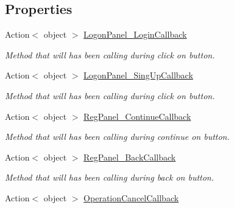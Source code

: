 \subsection*{Properties}
\begin{DoxyCompactItemize}
\item 
Action$<$ object $>$ \mbox{\hyperlink{class_wpf_handler_1_1_u_i_1_1_controls_1_1_logon_1_1_logon_screen_aaf6c43d29c350ee263c48cee22395866}{Logon\+Panel\+\_\+\+Login\+Callback}}
\begin{DoxyCompactList}\small\item\em Method that will has been calling during click on button. \end{DoxyCompactList}\item 
Action$<$ object $>$ \mbox{\hyperlink{class_wpf_handler_1_1_u_i_1_1_controls_1_1_logon_1_1_logon_screen_aaebc4715a8ea2a8d71275b1fe84f49d2}{Logon\+Panel\+\_\+\+Sing\+Up\+Callback}}
\begin{DoxyCompactList}\small\item\em Method that will has been calling during click on button. \end{DoxyCompactList}\item 
Action$<$ object $>$ \mbox{\hyperlink{class_wpf_handler_1_1_u_i_1_1_controls_1_1_logon_1_1_logon_screen_a7dda90d79034bc7a2064335d8ccdcd19}{Reg\+Panel\+\_\+\+Continue\+Callback}}
\begin{DoxyCompactList}\small\item\em Method that will has been calling during continue on button. \end{DoxyCompactList}\item 
Action$<$ object $>$ \mbox{\hyperlink{class_wpf_handler_1_1_u_i_1_1_controls_1_1_logon_1_1_logon_screen_ac42e1308611e356afc0be771b38f5a2c}{Reg\+Panel\+\_\+\+Back\+Callback}}
\begin{DoxyCompactList}\small\item\em Method that will has been calling during back on button. \end{DoxyCompactList}\item 
Action$<$ object $>$ \mbox{\hyperlink{class_wpf_handler_1_1_u_i_1_1_controls_1_1_logon_1_1_logon_screen_a3438f019d965cd643756e612dd8ac2d3}{Operation\+Cancel\+Callback}}

\end{DoxyCompactItemize}
